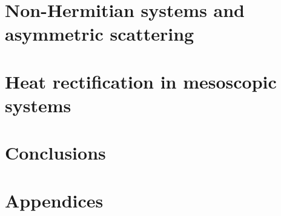 \documentclass[a4paper, 12pt, twoside, openright]{Thesis}  %
\begin{document}
\part{Non-Hermitian systems and asymmetric scattering\label{partI}}


\part{Heat rectification in mesoscopic systems\label{partII}}

\part*{Conclusions\label{partConclusions}}



\appendix %
\part*{Appendices}




\end{document}
